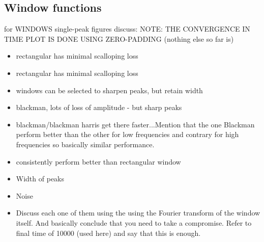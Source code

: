 \subsection{Window functions}
\begin{figure}[!ht]
	\centering
\end{figure}
\begin{figure}[!ht]
	\centering
	\label{fig:rectangle2DfreeSpace_filteringConvergence}
\end{figure}

\begin{figure}[!ht]
	\centering
\end{figure}
for WINDOWS single-peak figures discuss:
NOTE: THE CONVERGENCE IN TIME PLOT IS DONE USING ZERO-PADDING (nothing else so far is)
\begin{itemize}
\item rectangular has minimal scalloping loss
\item rectangular has minimal scalloping loss
\item windows can be selected to sharpen peaks, but retain width
\item blackman, lots of loss of amplitude - but sharp peaks
\item blackman/blackman harris get there faster...Mention that the one Blackman perform better than the other for low frequencies and contrary for high frequencies so basically similar performance.
\item consistently perform better than rectangular window
\item Width of peaks
\item Noise
\item Discuss each one of them using the using the Fourier transform of the window itself. And basically conclude that you need to take a compromise. Refer to final time of 10000 (used here) and say that this is enough.
\end{itemize}


